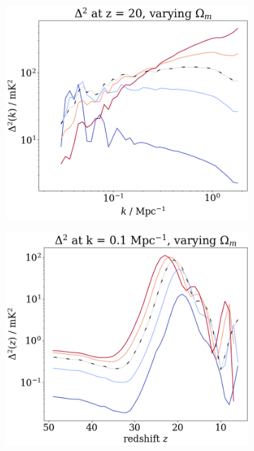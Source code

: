 \documentclass[floats,floatfix,showpacs,amssymb,prd,superscriptaddress,nofootinbib]{revtex4-2} %
\begin{document}
\begin{figure}[H]
\begin{subfigure}[b]{0.45\textwidth}
         \includegraphics[width=\textwidth]{images/simulation_results/power_spectrum_fixed_z_20_Om.png}
         \label{fig:power_spectrum_fixed_z_20_Om}
     \end{subfigure}
     \hfill
     \begin{subfigure}[b]{0.45\textwidth}
         \centering
         \includegraphics[width=\textwidth]{images/simulation_results/power_spectrum_fixed_k_0.1_Om.png}
         \label{fig:power_spectrum_fixed_k_0.1_Om}

\end{subfigure}
\end{figure}
\end{document}
